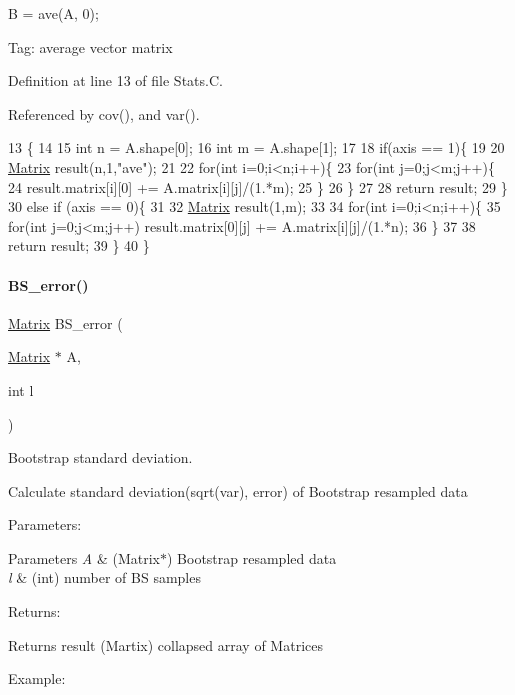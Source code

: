 B = ave(\+A, 0);

Tag\+: average vector matrix 

Definition at line 13 of file Stats.\+C.



Referenced by cov(), and var().


\begin{DoxyCode}
13                               \{
14   
15   \textcolor{keywordtype}{int} n = A.shape[0];
16   \textcolor{keywordtype}{int} m = A.shape[1];
17 
18   \textcolor{keywordflow}{if}(axis == 1)\{
19 
20     \hyperlink{classMatrix}{Matrix} result(n,1,\textcolor{stringliteral}{"ave"});
21 
22     \textcolor{keywordflow}{for}(\textcolor{keywordtype}{int} i=0;i<n;i++)\{
23       \textcolor{keywordflow}{for}(\textcolor{keywordtype}{int} j=0;j<m;j++)\{
24         result.matrix[i][0] += A.matrix[i][j]/(1.*m);
25       \}
26     \}
27     
28     \textcolor{keywordflow}{return} result;
29   \}
30   \textcolor{keywordflow}{else} \textcolor{keywordflow}{if} (axis == 0)\{
31     
32     \hyperlink{classMatrix}{Matrix} result(1,m);
33     
34     \textcolor{keywordflow}{for}(\textcolor{keywordtype}{int} i=0;i<n;i++)\{
35       \textcolor{keywordflow}{for}(\textcolor{keywordtype}{int} j=0;j<m;j++) result.matrix[0][j] += A.matrix[i][j]/(1.*n);
36     \}
37 
38     \textcolor{keywordflow}{return} result;
39   \}
40 \}
\end{DoxyCode}
\mbox{\label{Stats_8C_ae2e8a930a8ea255b6deb8f17f4d45206}} 
\paragraph{\texorpdfstring{B\+S\+\_\+error()}{BS\_error()}}
{\footnotesize\ttfamily \hyperlink{classMatrix}{Matrix} B\+S\+\_\+error (\begin{DoxyParamCaption}\item[{\hyperlink{classMatrix}{Matrix} $\ast$}]{A,  }\item[{int}]{l }\end{DoxyParamCaption})}



Bootstrap standard deviation. 

Calculate standard deviation(sqrt(var), error) of Bootstrap resampled data

Parameters\+: 
\begin{DoxyParams}{Parameters}
{\em A} & (Matrix$\ast$) Bootstrap resampled data \\
\hline
{\em l} & (int) number of BS samples\\
\hline
\end{DoxyParams}
Returns\+: \begin{DoxyReturn}{Returns}
result (Martix) collapsed array of Matrices
\end{DoxyReturn}
Example\+:

